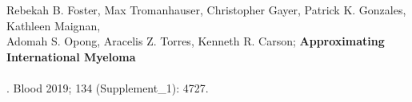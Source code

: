 \documentclass{resume} %
\begin{document}
\hspace*{1mm}Rebekah B. Foster, Max Tromanhauser, Christopher Gayer, Patrick K. Gonzales, Kathleen Maignan, \\
\hspace*{3mm}Adomah S. Opong, Aracelis Z. Torres, Kenneth R. Carson; {\bf Approximating International Myeloma } \\
\hspace*{3mm}{\bf Working Group Uniform Response Criteria to Derive Response for Multiple Myeloma (MM)} \\
\hspace*{3mm}{\bf Patients Using Data from Electronic Health Records (EHR)}. Blood 2019; 134 (Supplement\_1): 4727.





\end{document}
